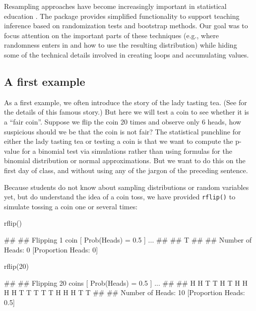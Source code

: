 Resampling approaches have become increasingly important in statistical
education \citep{Tintle:TAS:2015, Hesterberg:2015}. The 
package provides simplified functionality to support teaching inference
based on randomization tests and bootstrap methods. Our goal was to
focus attention on the important parts of these techniques (e.g., where
randomness enters in and how to use the resulting distribution) while
hiding some of the technical details involved in creating loops and
accumulating values.

\subsection{A first example}\label{a-first-example}

As a first example, we often introduce the story of the lady tasting
tea. (See \cite{Salsburg:2002} for the details of this famous story.)
But here we will test a coin to see whether it is a ``fair coin''.
Suppose we flip the coin 20 times and observe only 6 heads, how
suspicious should we be that the coin is not fair? The statistical
punchline for either the lady tasting tea or testing a coin is that we
want to compute the p-value for a binomial test via simulations rather
than using formulas for the binomial distribution or normal
approximations. But we want to do this on the first day of class, and
without using any of the jargon of the preceding sentence.

Because students do not know about sampling distributions or random
variables yet, but do understand the idea of a coin toss, we have
provided \texttt{rflip()} to simulate tossing a coin one or several
times:

\begin{Schunk}
\begin{Sinput}
rflip()
\end{Sinput}
\begin{Soutput}
## 
## Flipping 1 coin [ Prob(Heads) = 0.5 ] ...
## 
## T
## 
## Number of Heads: 0 [Proportion Heads: 0]
\end{Soutput}
\begin{Sinput}
rflip(20)
\end{Sinput}
\begin{Soutput}
## 
## Flipping 20 coins [ Prob(Heads) = 0.5 ] ...
## 
## H H T T H T H H H H T T T T T H H H T T
## 
## Number of Heads: 10 [Proportion Heads: 0.5]
\end{Soutput}
\end{Schunk}

